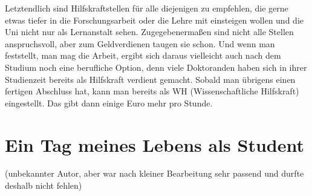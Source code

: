 Letztendlich sind Hilfskraftstellen für alle diejenigen zu empfehlen, die gerne etwas tiefer in die Forschungsarbeit oder die Lehre mit einsteigen wollen und die Uni nicht nur als Lernanstalt sehen. Zugegebenermaßen sind nicht alle Stellen anspruchsvoll, aber zum Geldverdienen taugen sie schon. Und wenn man feststellt, man mag die Arbeit, ergibt sich daraus vielleicht auch nach dem Studium noch eine berufliche Option, denn viele Doktoranden haben sich in ihrer Studienzeit bereits als Hilfskraft verdient gemacht. Sobald man übrigens einen fertigen Abschluss hat, kann man bereits als WH (Wissenschaftliche Hilfskraft) eingestellt. Das gibt dann einige Euro mehr pro Stunde. 

\newpage

\section{Ein Tag meines Lebens als Student}
(unbekannter Autor, aber war nach kleiner Bearbeitung sehr passend und durfte deshalb nicht fehlen)\\
